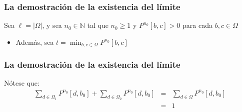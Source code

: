 \begin{frame}
\frametitle{La demostración de la existencia del límite}

{\small

Sea $\ell = |\Omega|$, y sea $n_0 \in \mathbb{N}$ tal que $n_0 \geq 1$ y $P^{n_0}[b,c] > 0$ para cada $b,c \in \Omega$
\begin{itemize}
\item Además, sea $t = {\displaystyle \min_{b,c \in \Omega} P^{n_0}[b,c]}$
\end{itemize}




}

\end{frame}

\begin{frame}
\frametitle{La demostración de la existencia del límite}

{\footnotesize

Nótese que:
\begin{eqnarray*}
\sum_{d \in \Omega_1} P^{n_0}[d, b_0] + \sum_{d \in \Omega_2} P^{n_0}[d, b_0] & = & \sum_{d \in \Omega} P^{n_0}[d, b_0]\\
& = & 1
\end{eqnarray*}





}

\end{frame}


